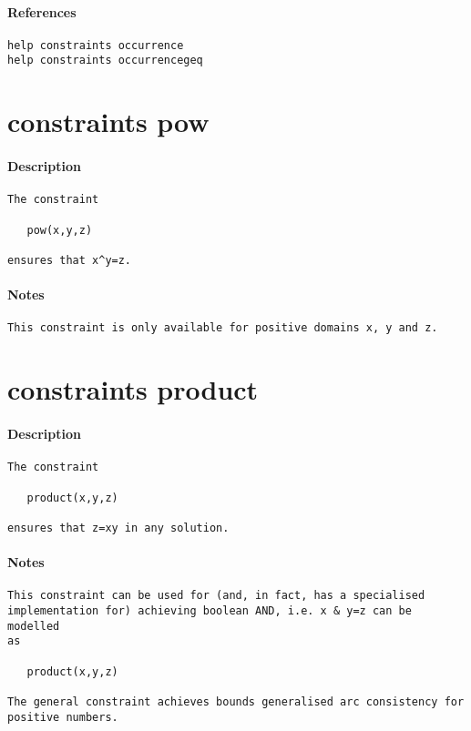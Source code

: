 \paragraph{References}
{\footnotesize
\begin{verbatim}
help constraints occurrence
help constraints occurrencegeq
\end{verbatim}
}
\section{constraints pow}
\paragraph{Description}
{\footnotesize
\begin{verbatim}
The constraint

   pow(x,y,z)

ensures that x^y=z.
\end{verbatim}
}
\paragraph{Notes}
{\footnotesize
\begin{verbatim}
This constraint is only available for positive domains x, y and z.
\end{verbatim}
}
\section{constraints product}
\paragraph{Description}
{\footnotesize
\begin{verbatim}
The constraint

   product(x,y,z)

ensures that z=xy in any solution.
\end{verbatim}
}
\paragraph{Notes}
{\footnotesize
\begin{verbatim}
This constraint can be used for (and, in fact, has a specialised
implementation for) achieving boolean AND, i.e. x & y=z can be modelled
as

   product(x,y,z)

The general constraint achieves bounds generalised arc consistency for
positive numbers.
\end{verbatim}
}
